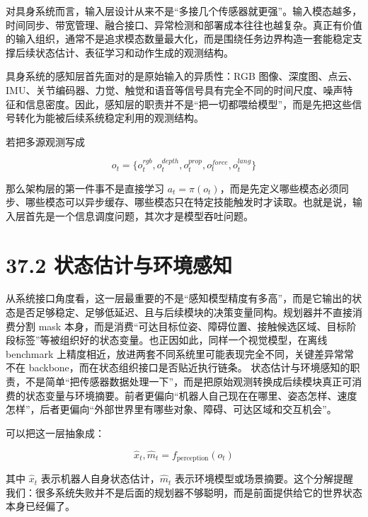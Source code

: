 对具身系统而言，输入层设计从来不是“多接几个传感器就更强”。输入模态越多，时间同步、带宽管理、融合接口、异常检测和部署成本往往也越复杂。真正有价值的输入组织，通常不是追求模态数量最大化，而是围绕任务边界构造一套能稳定支撑后续状态估计、表征学习和动作生成的观测结构。

具身系统的感知层首先面对的是原始输入的异质性：RGB 图像、深度图、点云、IMU、关节编码器、力觉、触觉和语音等信号具有完全不同的时间尺度、噪声特征和信息密度。因此，感知层的职责并不是“把一切都喂给模型”，而是先把这些信号转化为能被后续系统稳定利用的观测结构。

若把多源观测写成

\begingroup
\footnotesize
\begin{equation*}
o_t = \{o_t^{rgb}, o_t^{depth}, o_t^{prop}, o_t^{force}, o_t^{lang}\}
\end{equation*}
\endgroup

那么架构层的第一件事不是直接学习 \(a_t = \pi(o_t)\)，而是先定义哪些模态必须同步、哪些模态可以异步缓存、哪些模态只在特定技能触发时才读取。也就是说，输入层首先是一个信息调度问题，其次才是模型吞吐问题。

\section*{37.2 状态估计与环境感知}


从系统接口角度看，这一层最重要的不是“感知模型精度有多高”，而是它输出的状态是否足够稳定、足够低延迟、且与后续模块的决策变量同构。规划器并不直接消费分割 mask 本身，而是消费“可达目标位姿、障碍位置、接触候选区域、目标阶段标签”等被组织好的状态变量。也正因如此，同样一个视觉模型，在离线 benchmark 上精度相近，放进两套不同系统里可能表现完全不同，关键差异常常不在 backbone，而在状态组织接口是否贴近执行链条。 状态估计与环境感知的职责，不是简单“把传感器数据处理一下”，而是把原始观测转换成后续模块真正可消费的状态变量与环境摘要。前者更偏向“机器人自己现在在哪里、姿态怎样、速度怎样”，后者更偏向“外部世界里有哪些对象、障碍、可达区域和交互机会”。

可以把这一层抽象成：

\begin{equation*}
\hat{x}_t, \hat{m}_t = f_{\text{perception}}(o_t)
\end{equation*}

其中 \(\hat{x}_t\) 表示机器人自身状态估计，\(\hat{m}_t\) 表示环境模型或场景摘要。这个分解提醒我们：很多系统失败并不是后面的规划器不够聪明，而是前面提供给它的世界状态本身已经偏了。

